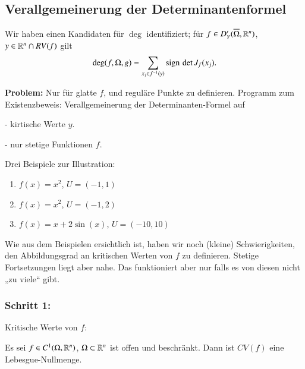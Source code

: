 \subsection{Verallgemeinerung der Determinantenformel}

Wir haben einen Kandidaten für $\deg$ identifiziert; für $f\in D'_Y(\overline\Omega,\mathbb{R}^n)$, $y\in \mathbb{R}^n\cap
RV(f)$ gilt
\[
    \deg(f,\Omega, g)=\sum_{x_j\in f^{-1}(y)} \mathrm{sign}\, \det J_f(x_j).
\]

\noindent \textbf{Problem:} Nur für glatte $f$, und reguläre Punkte zu definieren. Programm zum 
Existenzbeweis: Verallgemeinerung der Determinanten-Formel auf
\begin{description}
    \item{-} kirtische Werte $y$.
    \item{-} nur stetige Funktionen $f$.
\end{description}

\noindent Drei Beispiele zur Illustration:
\begin{enumerate}
    \item $f(x)=x^2$, $U=(-1,1)$
    \item $f(x)=x^2$, $U=(-1,2)$
    \item $f(x)=x+2\sin(x)$, $U=(-10,10)$
\end{enumerate}
Wie aus dem Beispielen ersichtlich ist, haben wir noch (kleine) Schwierigkeiten, den Abbildungsgrad
an kritischen Werten von $f$ zu definieren. Stetige Fortsetzungen liegt aber nahe. Das funktioniert
aber nur falls es von diesen nicht „zu viele“ gibt.

\subsubsection*{Schritt 1:} Kritische Werte von $f$:

\begin{lem}[Sard]\label{2.5}

Es sei $f\in C^1(\Omega, \mathbb{R}^n)$, $\Omega\subset\mathbb{R}^n$ ist offen und beschränkt. Dann ist
$CV(f)$ eine Lebesgue-Nullmenge.
\end{lem}
    
